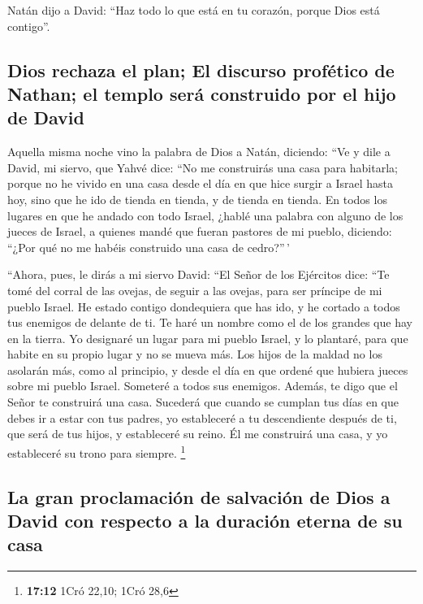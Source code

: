  Natán dijo a David: ``Haz todo lo que está en tu corazón,
porque Dios está contigo''.

\hypertarget{dios-rechaza-el-plan-el-discurso-profuxe9tico-de-nathan-el-templo-seruxe1-construido-por-el-hijo-de-david}{%
\subsection{Dios rechaza el plan; El discurso profético de Nathan; el
templo será construido por el hijo de
David}\label{dios-rechaza-el-plan-el-discurso-profuxe9tico-de-nathan-el-templo-seruxe1-construido-por-el-hijo-de-david}}

 Aquella misma noche vino la palabra de Dios a Natán,
diciendo:  ``Ve y dile a David, mi siervo, que Yahvé dice:
``No me construirás una casa para habitarla;  porque no he
vivido en una casa desde el día en que hice surgir a Israel hasta hoy,
sino que he ido de tienda en tienda, y de tienda en tienda.
 En todos los lugares en que he andado con todo Israel,
¿hablé una palabra con alguno de los jueces de Israel, a quienes mandé
que fueran pastores de mi pueblo, diciendo: ``¿Por qué no me habéis
construido una casa de cedro?''\,'

 ``Ahora, pues, le dirás a mi siervo David: ``El Señor de
los Ejércitos dice: ``Te tomé del corral de las ovejas, de seguir a las
ovejas, para ser príncipe de mi pueblo Israel.  He estado
contigo dondequiera que has ido, y he cortado a todos tus enemigos de
delante de ti. Te haré un nombre como el de los grandes que hay en la
tierra.  Yo designaré un lugar para mi pueblo Israel, y lo
plantaré, para que habite en su propio lugar y no se mueva más. Los
hijos de la maldad no los asolarán más, como al principio,
 y desde el día en que ordené que hubiera jueces sobre mi
pueblo Israel. Someteré a todos sus enemigos. Además, te digo que el
Señor te construirá una casa.  Sucederá que cuando se
cumplan tus días en que debes ir a estar con tus padres, yo estableceré
a tu descendiente después de ti, que será de tus hijos, y estableceré su
reino.  Él me construirá una casa, y yo estableceré su
trono para siempre. \footnote{\textbf{17:12} 1Cró 22,10; 1Cró 28,6}

\hypertarget{la-gran-proclamaciuxf3n-de-salvaciuxf3n-de-dios-a-david-con-respecto-a-la-duraciuxf3n-eterna-de-su-casa}{%
\subsection{La gran proclamación de salvación de Dios a David con
respecto a la duración eterna de su
casa}\label{la-gran-proclamaciuxf3n-de-salvaciuxf3n-de-dios-a-david-con-respecto-a-la-duraciuxf3n-eterna-de-su-casa}}

